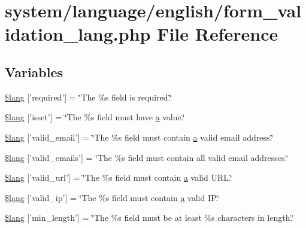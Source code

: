 \hypertarget{form__validation__lang_8php}{\section{system/language/english/form\-\_\-validation\-\_\-lang.php File Reference}
\label{form__validation__lang_8php}
}
\subsection*{Variables}
\begin{DoxyCompactItemize}
\item 
\hyperlink{form__validation__lang_8php_ac05864968b28fa7a4476f49e6b8d4433}{\$lang} \mbox{[}'required'\mbox{]} = \char`\"{}The \%s field is required.\char`\"{}
\item 
\hyperlink{form__validation__lang_8php_a7fcb906106dda1aee23bf5bc22024354}{\$lang} \mbox{[}'isset'\mbox{]} = \char`\"{}The \%s field must have \hyperlink{bootstrap_8min_8js_a7318f59fb86a4437995ee89c780c51ac}{a} value.\char`\"{}
\item 
\hyperlink{form__validation__lang_8php_ac65b0427695080708e293f1bd469a94d}{\$lang} \mbox{[}'valid\-\_\-email'\mbox{]} = \char`\"{}The \%s field must contain \hyperlink{bootstrap_8min_8js_a7318f59fb86a4437995ee89c780c51ac}{a} valid email address.\char`\"{}
\item 
\hyperlink{form__validation__lang_8php_abf35f5d2105406bc8c673a40b31388ba}{\$lang} \mbox{[}'valid\-\_\-emails'\mbox{]} = \char`\"{}The \%s field must contain all valid email addresses.\char`\"{}
\item 
\hyperlink{form__validation__lang_8php_ad972568b7943f130b6b241a6b31d455b}{\$lang} \mbox{[}'valid\-\_\-url'\mbox{]} = \char`\"{}The \%s field must contain \hyperlink{bootstrap_8min_8js_a7318f59fb86a4437995ee89c780c51ac}{a} valid U\-R\-L.\char`\"{}
\item 
\hyperlink{form__validation__lang_8php_ad153ba0f29eaf9bbdb529c2f03f29751}{\$lang} \mbox{[}'valid\-\_\-ip'\mbox{]} = \char`\"{}The \%s field must contain \hyperlink{bootstrap_8min_8js_a7318f59fb86a4437995ee89c780c51ac}{a} valid I\-P.\char`\"{}
\item 
\hyperlink{form__validation__lang_8php_a64646d89fb51eebd0b5bea81fd17eb1f}{\$lang} \mbox{[}'min\-\_\-length'\mbox{]} = \char`\"{}The \%s field must be at least \%s characters in length.\char`\"{}
\item 

\end{DoxyCompactItemize}
